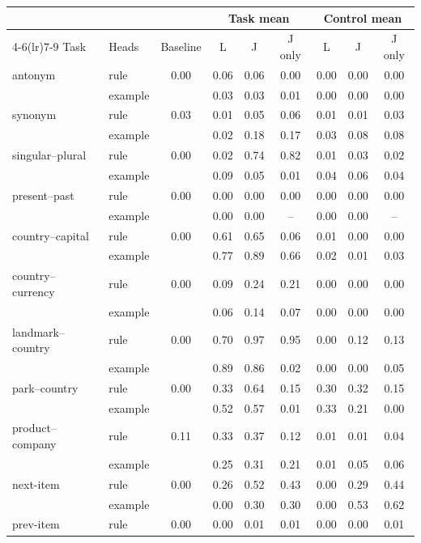 \begin{tabular}{@{}llccccccc@{}}
\toprule
 & & & \multicolumn{3}{c}{Task mean} & \multicolumn{3}{c}{Control mean} \\
\cmidrule(lr){4-6}\cmidrule(lr){7-9}
Task & Heads & Baseline & L & J & J only & L & J & J only \\
\midrule
antonym & rule & 0.00 & 0.06 & 0.06 & 0.00 & 0.00 & 0.00 & 0.00 \\
 & example &  & 0.03 & 0.03 & 0.01 & 0.00 & 0.00 & 0.00 \\
synonym & rule & 0.03 & 0.01 & 0.05 & 0.06 & 0.01 & 0.01 & 0.03 \\
 & example &  & 0.02 & 0.18 & 0.17 & 0.03 & 0.08 & 0.08 \\
singular--plural & rule & 0.00 & 0.02 & 0.74 & 0.82 & 0.01 & 0.03 & 0.02 \\
 & example &  & 0.09 & 0.05 & 0.01 & 0.04 & 0.06 & 0.04 \\
present--past & rule & 0.00 & 0.00 & 0.00 & 0.00 & 0.00 & 0.00 & 0.00 \\
 & example &  & 0.00 & 0.00 & -- & 0.00 & 0.00 & -- \\
country--capital & rule & 0.00 & 0.61 & 0.65 & 0.06 & 0.01 & 0.00 & 0.00 \\
 & example &  & 0.77 & 0.89 & 0.66 & 0.02 & 0.01 & 0.03 \\
country--currency & rule & 0.00 & 0.09 & 0.24 & 0.21 & 0.00 & 0.00 & 0.00 \\
 & example &  & 0.06 & 0.14 & 0.07 & 0.00 & 0.00 & 0.00 \\
landmark--country & rule & 0.00 & 0.70 & 0.97 & 0.95 & 0.00 & 0.12 & 0.13 \\
 & example &  & 0.89 & 0.86 & 0.02 & 0.00 & 0.00 & 0.05 \\
park--country & rule & 0.00 & 0.33 & 0.64 & 0.15 & 0.30 & 0.32 & 0.15 \\
 & example &  & 0.52 & 0.57 & 0.01 & 0.33 & 0.21 & 0.00 \\
product--company & rule & 0.11 & 0.33 & 0.37 & 0.12 & 0.01 & 0.01 & 0.04 \\
 & example &  & 0.25 & 0.31 & 0.21 & 0.01 & 0.05 & 0.06 \\
next-item & rule & 0.00 & 0.26 & 0.52 & 0.43 & 0.00 & 0.29 & 0.44 \\
 & example &  & 0.00 & 0.30 & 0.30 & 0.00 & 0.53 & 0.62 \\
prev-item & rule & 0.00 & 0.00 & 0.01 & 0.01 & 0.00 & 0.00 & 0.01 \\

\end{tabular}
